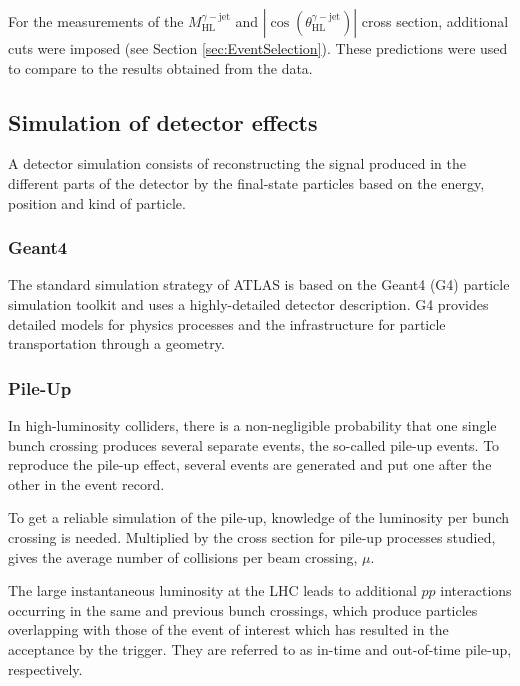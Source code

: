 \documentclass[12pt, twoside]{article}
\numberwithin{equation}{section}
\numberwithin{figure}{section}
\begin{document}
For the measurements of the $M^{	\gamma-\text{jet}}_{\text{HL}}$ and $\left| \cos \left(\theta^{\gamma-\text{jet}}_{\text{HL}} \right) \right|$ cross section, additional cuts were imposed (see Section \ref{sec:EventSelection}). These predictions were used to compare to the results obtained from the data.

\subsection{Simulation of detector effects}
\label{subsec:SimulationOfDetectorEffects}

A detector simulation consists of reconstructing the signal produced in the different parts of the detector by the final-state particles based on the energy, position and kind of particle.

\subsubsection{Geant4}
\label{subsubsec:Geant4}

The standard simulation strategy of ATLAS is based on the Geant4 (G4) particle simulation toolkit and uses a highly-detailed detector description. G4 provides detailed models for physics processes and the infrastructure for particle transportation through a geometry.

\newpage
\subsubsection{Pile-Up}
\label{subsubsec:Pile-Up}

In high-luminosity colliders, there is a non-negligible probability that one single bunch crossing produces several separate events, the so-called pile-up events. To reproduce the pile-up effect, several events are generated and put one after the other in the event record.

To get a reliable simulation of the pile-up, knowledge of the luminosity per bunch crossing is needed. Multiplied by the cross section for pile-up processes studied, gives the average number of collisions per beam crossing, $\mu$.

The large instantaneous luminosity at the LHC leads to additional $pp$ interactions occurring in the same and previous bunch crossings, which produce particles overlapping with those of the event of interest which has resulted in the acceptance by the trigger. They are referred to as in-time and out-of-time pile-up, respectively.
\end{document}
